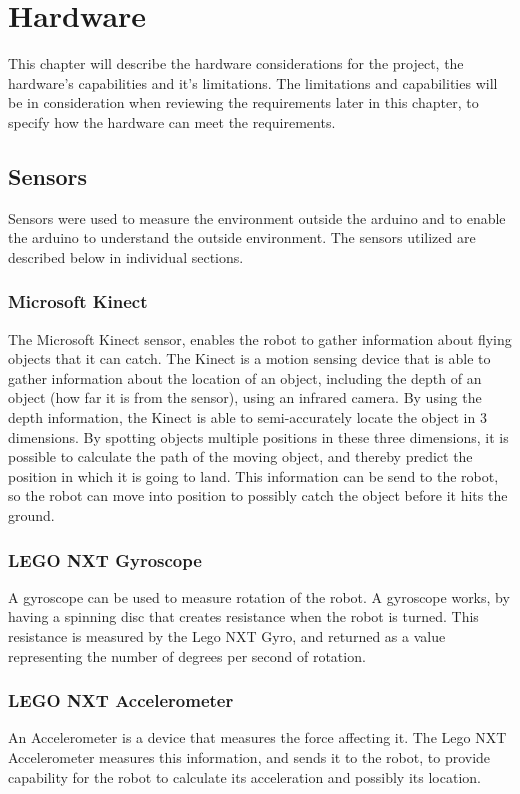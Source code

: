 \chapter{Hardware}
\label{chap:Hardware} 
This chapter will describe the hardware considerations for the project, the hardware’s capabilities and it’s limitations. The limitations and capabilities will be in consideration when reviewing the requirements later in this chapter, to specify how the hardware can meet the requirements.

\section{Sensors}
\label{sec:Sensors}
Sensors were used to measure the environment outside the arduino and to enable the arduino to understand the outside environment. The sensors utilized are described below in individual sections. 

\subsection{Microsoft Kinect}
\label{sec:Microsoft Kinect}
The Microsoft Kinect sensor, enables the robot to gather information about flying objects that it can catch. The Kinect is a motion sensing device that is able to gather information about the location of an object, including the depth of an object (how far it is from the sensor), using an infrared camera. By using the depth information, the Kinect is able to semi-accurately locate the object in 3 dimensions.
By spotting objects multiple positions in these three dimensions, it is possible to calculate the path of the moving object, and thereby predict the position in which it is going to land. This information can be send to the robot, so the robot can move into position to possibly catch the object before it hits the ground.

\subsection{LEGO NXT Gyroscope}
\label{sec:LEGO NXT Gyroscope}
A gyroscope can be used to measure rotation of the robot. A gyroscope works, by having a spinning disc that creates resistance when the robot is turned. This resistance is measured by the Lego NXT Gyro, and returned as a value representing the number of degrees per second of rotation. 

\subsection{LEGO NXT Accelerometer}
\label{sec:LEGO NXT Accelerometer}
An Accelerometer is a device that measures the force affecting it. The Lego NXT Accelerometer measures this information, and sends it to the robot, to provide capability for the robot to calculate its acceleration and possibly its location.

